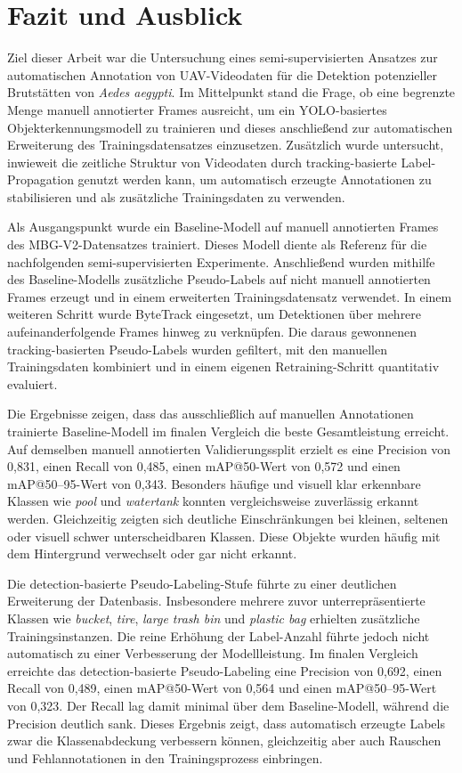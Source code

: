 \section{Fazit und Ausblick}

Ziel dieser Arbeit war die Untersuchung eines semi-supervisierten Ansatzes zur
automatischen Annotation von UAV-Videodaten für die Detektion potenzieller
Brutstätten von \textit{Aedes aegypti}. Im Mittelpunkt stand die Frage, ob eine
begrenzte Menge manuell annotierter Frames ausreicht, um ein YOLO-basiertes
Objekterkennungsmodell zu trainieren und dieses anschließend zur automatischen
Erweiterung des Trainingsdatensatzes einzusetzen. Zusätzlich wurde untersucht,
inwieweit die zeitliche Struktur von Videodaten durch tracking-basierte
Label-Propagation genutzt werden kann, um automatisch erzeugte Annotationen
zu stabilisieren und als zusätzliche Trainingsdaten zu verwenden.

Als Ausgangspunkt wurde ein Baseline-Modell auf manuell annotierten Frames des
MBG-V2-Datensatzes trainiert. Dieses Modell diente als Referenz für die
nachfolgenden semi-supervisierten Experimente. Anschließend wurden mithilfe des
Baseline-Modells zusätzliche Pseudo-Labels auf nicht manuell annotierten Frames
erzeugt und in einem erweiterten Trainingsdatensatz verwendet. In einem weiteren
Schritt wurde ByteTrack eingesetzt, um Detektionen über mehrere
aufeinanderfolgende Frames hinweg zu verknüpfen. Die daraus gewonnenen
tracking-basierten Pseudo-Labels wurden gefiltert, mit den manuellen
Trainingsdaten kombiniert und in einem eigenen Retraining-Schritt quantitativ
evaluiert.

Die Ergebnisse zeigen, dass das ausschließlich auf manuellen Annotationen
trainierte Baseline-Modell im finalen Vergleich die beste Gesamtleistung erreicht.
Auf demselben manuell annotierten Validierungssplit erzielt es eine Precision von
0{,}831, einen Recall von 0{,}485, einen mAP@50-Wert von 0{,}572 und einen
mAP@50--95-Wert von 0{,}343. Besonders häufige und visuell klar erkennbare
Klassen wie \textit{pool} und \textit{watertank} konnten vergleichsweise zuverlässig
erkannt werden. Gleichzeitig zeigten sich deutliche Einschränkungen bei kleinen,
seltenen oder visuell schwer unterscheidbaren Klassen. Diese Objekte wurden
häufig mit dem Hintergrund verwechselt oder gar nicht erkannt.

Die detection-basierte Pseudo-Labeling-Stufe führte zu einer deutlichen
Erweiterung der Datenbasis. Insbesondere mehrere zuvor unterrepräsentierte
Klassen wie \textit{bucket}, \textit{tire}, \textit{large trash bin} und
\textit{plastic bag} erhielten zusätzliche Trainingsinstanzen. Die reine Erhöhung
der Label-Anzahl führte jedoch nicht automatisch zu einer Verbesserung der
Modellleistung. Im finalen Vergleich erreichte das detection-basierte
Pseudo-Labeling eine Precision von 0{,}692, einen Recall von 0{,}489, einen
mAP@50-Wert von 0{,}564 und einen mAP@50--95-Wert von 0{,}323. Der Recall
lag damit minimal über dem Baseline-Modell, während die Precision deutlich sank.
Dieses Ergebnis zeigt, dass automatisch erzeugte Labels zwar die Klassenabdeckung
verbessern können, gleichzeitig aber auch Rauschen und Fehlannotationen in den
Trainingsprozess einbringen.

